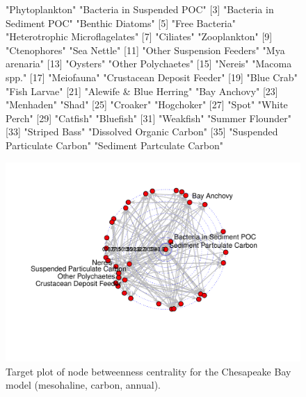 \documentclass[article]{jss}
\begin{document}
\begin{figure}[!htbp]
  \center
\begin{Schunk}
\begin{Soutput}
 [1] "Phytoplankton"                 "Bacteria in Suspended POC"    
 [3] "Bacteria in Sediment POC"      "Benthic Diatoms"              
 [5] "Free Bacteria"                 "Heterotrophic Microflagelates"
 [7] "Ciliates"                      "Zooplankton"                  
 [9] "Ctenophores"                   "Sea Nettle"                   
[11] "Other Suspension Feeders"      "Mya arenaria"                 
[13] "Oysters"                       "Other Polychaetes"            
[15] "Nereis"                        "Macoma spp."                  
[17] "Meiofauna"                     "Crustacean Deposit Feeder"    
[19] "Blue Crab"                     "Fish Larvae"                  
[21] "Alewife & Blue Herring"        "Bay Anchovy"                  
[23] "Menhaden"                      "Shad"                         
[25] "Croaker"                       "Hogchoker"                    
[27] "Spot"                          "White Perch"                  
[29] "Catfish"                       "Bluefish"                     
[31] "Weakfish"                      "Summer Flounder"              
[33] "Striped Bass"                  "Dissolved Organic Carbon"     
[35] "Suspended Particulate Carbon"  "Sediment Partculate Carbon"   
\end{Soutput}
\end{Schunk}
\includegraphics{enaR-vignette-053}
\caption{Target plot of node betweenness centrality for the Chesapeake
  Bay model (mesohaline, carbon, annual).} \label{fig:target}
\end{figure}
\end{document}
